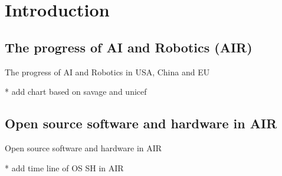 \section{Introduction}

\subsection{The progress of AI and Robotics (AIR)}

{
\begin{frame}{The progress of AI and Robotics in USA, China and EU}

* add chart based on savage and unicef      
\begin{figure}
 \centering
\end{figure}

\end{frame}
}



\subsection{Open source software and hardware in AIR}

{
\begin{frame}{Open source software and hardware in AIR}

* add time line of OS SH in AIR
      \begin{figure}
        \centering
      \end{figure}
\end{frame}
}

